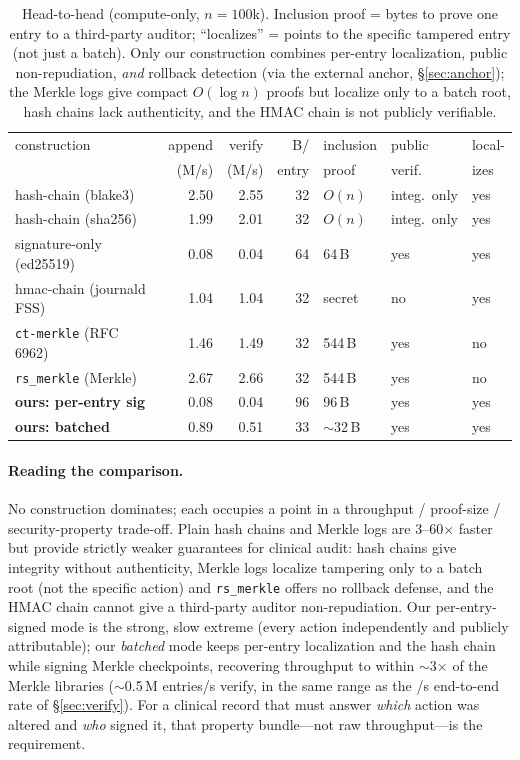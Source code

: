 \documentclass[11pt]{article}
\begin{document}
\begin{table}[htb]\centering\small
\begin{tabular}{lrrrlll}
\toprule
construction & append & verify & B/ & inclusion & public & local- \\
 & (M/s) & (M/s) & entry & proof & verif. & izes \\
\midrule
hash-chain (blake3) & 2.50 & 2.55 & 32 & $O(n)$ & integ.\ only & yes \\
hash-chain (sha256) & 1.99 & 2.01 & 32 & $O(n)$ & integ.\ only & yes \\
signature-only (ed25519) & 0.08 & 0.04 & 64 & 64\,B & yes & yes \\
hmac-chain (journald FSS) & 1.04 & 1.04 & 32 & secret & no & yes \\
\texttt{ct-merkle} (RFC 6962) & 1.46 & 1.49 & 32 & 544\,B & yes & no \\
\texttt{rs\_merkle} (Merkle) & 2.67 & 2.66 & 32 & 544\,B & yes & no \\
\textbf{ours: per-entry sig} & 0.08 & 0.04 & 96 & 96\,B & yes & yes \\
\textbf{ours: batched} & 0.89 & 0.51 & 33 & $\sim$32\,B & yes & yes \\
\bottomrule
\end{tabular}
\caption{Head-to-head (compute-only, $n{=}100$k). Inclusion proof = bytes to prove one entry to a
third-party auditor; ``localizes'' = points to the specific tampered entry (not just a batch). Only our
construction combines per-entry localization, public non-repudiation, \emph{and} rollback detection
(via the external anchor, \S\ref{sec:anchor}); the Merkle logs give compact $O(\log n)$ proofs but
localize only to a batch root, hash chains lack authenticity, and the HMAC chain is not publicly verifiable.}
\label{tab:compare}
\end{table}

\paragraph{Reading the comparison.} No construction dominates; each occupies a point in a throughput /
proof-size / security-property trade-off. Plain hash chains and Merkle logs are 3--60$\times$ faster but
provide strictly weaker guarantees for clinical audit: hash chains give integrity without authenticity,
Merkle logs localize tampering only to a batch root (not the specific action) and \texttt{rs\_merkle}
offers no rollback defense, and the HMAC chain cannot give a third-party auditor non-repudiation. Our
per-entry-signed mode is the strong, slow extreme (every action independently and publicly attributable);
our \emph{batched} mode keeps per-entry localization and the hash chain while signing Merkle checkpoints,
recovering throughput to within $\sim$3$\times$ of the Merkle libraries ($\sim$0.5\,M entries/s verify,
in the same range as the \VerifyThru/s end-to-end rate of \S\ref{sec:verify}). For a clinical record that must answer
\emph{which} action was altered and \emph{who} signed it, that property bundle---not raw throughput---is
the requirement.
\end{document}

